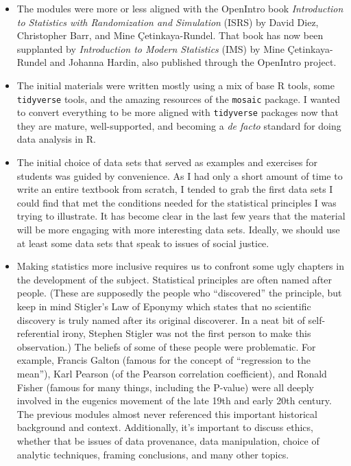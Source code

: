 \documentclass[
]{book}
\providecommand{\tightlist}{%
  \setlength{\itemsep}{0pt}\setlength{\parskip}{0pt}}
\begin{document}
\begin{itemize}
\tightlist
\item
  The modules were more or less aligned with the OpenIntro book \emph{Introduction to Statistics with Randomization and Simulation} (ISRS) by David Diez, Christopher Barr, and Mine Çetinkaya-Rundel. That book has now been supplanted by \emph{Introduction to Modern Statistics} (IMS) by Mine Çetinkaya-Rundel and Johanna Hardin, also published through the OpenIntro project.
\item
  The initial materials were written mostly using a mix of base R tools, some \texttt{tidyverse} tools, and the amazing resources of the \texttt{mosaic} package. I wanted to convert everything to be more aligned with \texttt{tidyverse} packages now that they are mature, well-supported, and becoming a \emph{de facto} standard for doing data analysis in R.
\item
  The initial choice of data sets that served as examples and exercises for students was guided by convenience. As I had only a short amount of time to write an entire textbook from scratch, I tended to grab the first data sets I could find that met the conditions needed for the statistical principles I was trying to illustrate. It has become clear in the last few years that the material will be more engaging with more interesting data sets. Ideally, we should use at least some data sets that speak to issues of social justice.
\item
  Making statistics more inclusive requires us to confront some ugly chapters in the development of the subject. Statistical principles are often named after people. (These are supposedly the people who ``discovered'' the principle, but keep in mind Stigler's Law of Eponymy which states that no scientific discovery is truly named after its original discoverer. In a neat bit of self-referential irony, Stephen Stigler was not the first person to make this observation.) The beliefs of some of these people were problematic. For example, Francis Galton (famous for the concept of ``regression to the mean''), Karl Pearson (of the Pearson correlation coefficient), and Ronald Fisher (famous for many things, including the P-value) were all deeply involved in the eugenics movement of the late 19th and early 20th century. The previous modules almost never referenced this important historical background and context. Additionally, it's important to discuss ethics, whether that be issues of data provenance, data manipulation, choice of analytic techniques, framing conclusions, and many other topics.
\end{itemize}
\end{document}
